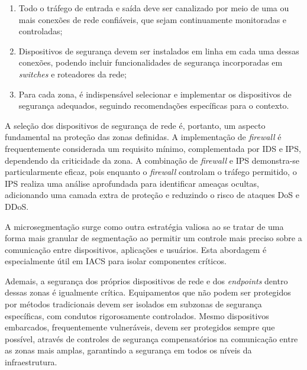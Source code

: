         \begin{enumerate}
            \item Todo o tráfego de entrada e saída deve ser canalizado por meio de uma ou mais conexões de rede confiáveis, que sejam continuamente monitoradas e controladas;
            \item Dispositivos de segurança devem ser instalados em linha em cada uma dessas conexões, podendo incluir funcionalidades de segurança incorporadas em \textit{switches} e roteadores da rede;
            \item Para cada zona, é indispensável selecionar e implementar os dispositivos de segurança adequados, seguindo recomendações específicas para o contexto.
        \end{enumerate}    

        A seleção dos dispositivos de segurança de rede é, portanto, um aspecto fundamental na proteção das zonas definidas. A implementação de \textit{firewall} é frequentemente considerada um requisito mínimo, complementada por IDS e IPS, dependendo da criticidade da zona. A combinação de \textit{firewall} e IPS demonstra-se particularmente eficaz, pois enquanto o \textit{firewall} controlam o tráfego permitido, o IPS realiza uma análise aprofundada para identificar ameaças ocultas, adicionando uma camada extra de proteção e reduzindo o risco de ataques DoS e DDoS.

    
        A microsegmentação surge como outra estratégia valiosa ao se tratar de uma forma mais granular de segmentação ao permitir um controle mais preciso sobre a comunicação entre dispositivos, aplicações e usuários. Esta abordagem é especialmente útil em IACS para isolar componentes críticos.
        

        Ademais, a segurança dos próprios dispositivos de rede e dos \textit{endpoints} dentro dessas zonas é igualmente crítica. Equipamentos que não podem ser protegidos por métodos tradicionais devem ser isolados em subzonas de segurança específicas, com condutos rigorosamente controlados. Mesmo dispositivos embarcados, frequentemente vulneráveis, devem ser protegidos sempre que possível, através de controles de segurança compensatórios na comunicação entre as zonas mais amplas, garantindo a segurança em todos os níveis da infraestrutura.

